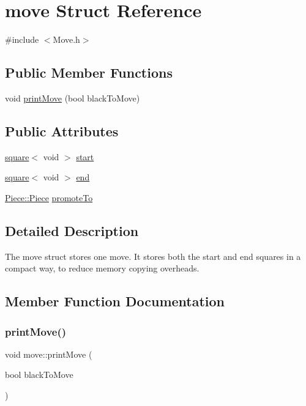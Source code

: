 \hypertarget{structmove}{}\section{move Struct Reference}
\label{structmove}


{\ttfamily \#include $<$Move.\+h$>$}

\subsection*{Public Member Functions}
\begin{DoxyCompactItemize}
\item 
void \hyperlink{structmove_a1586ed1c5f7173c4b60fa306522e4f64}{print\+Move} (bool black\+To\+Move)
\end{DoxyCompactItemize}
\subsection*{Public Attributes}
\begin{DoxyCompactItemize}
\item 
\hyperlink{structsquare}{square}$<$ void $>$ \hyperlink{structmove_a3f8a82f7c7bc55f55874026ac254cd85}{start}
\item 
\hyperlink{structsquare}{square}$<$ void $>$ \hyperlink{structmove_a205ae16ec975ed71eb4233bb38d21a75}{end}
\item 
\hyperlink{namespacePiece_a588233307aa6bdb32c1d62c9f20895cc}{Piece\+::\+Piece} \hyperlink{structmove_a87fc4fc521c961cce03613dcb6cd0c6b}{promote\+To}
\end{DoxyCompactItemize}


\subsection{Detailed Description}
The move struct stores one move. It stores both the start and end squares in a compact way, to reduce memory copying overheads. 

\subsection{Member Function Documentation}
\mbox{\label{structmove_a1586ed1c5f7173c4b60fa306522e4f64}} 
\subsubsection{\texorpdfstring{print\+Move()}{printMove()}}
{\footnotesize\ttfamily void move\+::print\+Move (\begin{DoxyParamCaption}\item[{bool}]{black\+To\+Move }\end{DoxyParamCaption})\hspace{0.3cm}{\ttfamily [inline]}}

